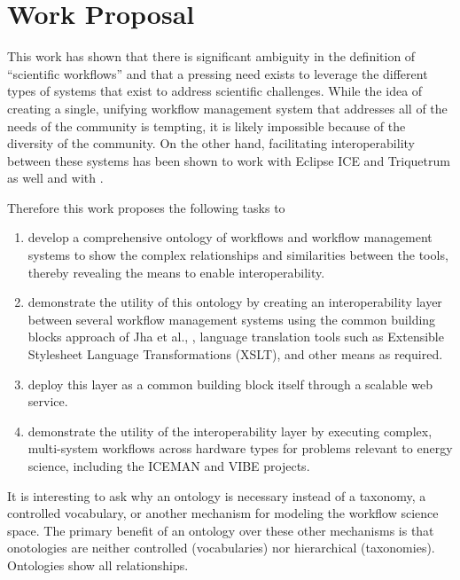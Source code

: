 \chapter{Work Proposal}

This work has shown that there is significant ambiguity in the
definition of ``scientific workflows'' and that a pressing need exists
to leverage the different types of systems that exist to address
scientific challenges. While the idea of creating a single, unifying
workflow management system that addresses all of the needs of the
community is tempting, it is likely impossible because of the diversity of the
community.
On the other hand, facilitating interoperability between these systems has been shown to
work with Eclipse ICE and Triquetrum as well and with
\cite{mandal_integrating_2007}.

Therefore this work proposes the following tasks to

\begin{enumerate}
\itemsep1pt\parskip0pt
\item
  develop a comprehensive ontology of workflows and workflow management
  systems to show the complex relationships and similarities between the
  tools, thereby revealing the means to enable interoperability.
\item
  demonstrate the utility of this ontology by creating an
  interoperability layer between several workflow management systems
  using the common building blocks approach of Jha et al.,
  \cite{jha_building_2016}, language translation tools such as Extensible Stylesheet Language Transformations (XSLT), and other means as required.
\item
  deploy this layer as a common building block itself through a scalable
  web service.
\item
  demonstrate the utility of the interoperability layer by executing
  complex, multi-system workflows across hardware types for problems
  relevant to energy science, including the ICEMAN and VIBE projects.
\end{enumerate}

It is interesting to ask why an ontology is necessary instead of a
taxonomy, a controlled vocabulary, or another mechanism for modeling the
workflow science space. The primary benefit of an ontology over these
other mechanisms is that onotologies are neither controlled
(vocabularies) nor hierarchical (taxonomies). Ontologies show all
relationships.

